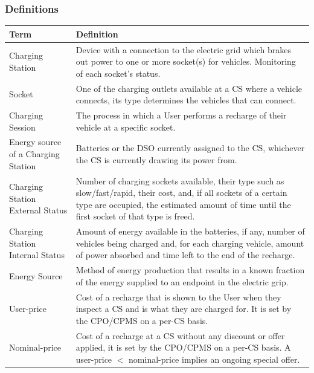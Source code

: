 \documentclass[11pt]{article}
\begin{document}
\subsubsection{Definitions}

\begin{table}[H]
    \centering
    \setlength{\tabcolsep}{18pt}
    \renewcommand{\arraystretch}{1.2}
    \begin{tabularx}{\textwidth}{|>{\centering\hsize=0.4\hsize}X|>{\hsize=1.6\hsize}X|}
        \hline
        \textbf{Term} & \textbf{Definition} \\
        \hline
        Charging Station & Device with a connection to the electric grid which brakes out power to one or more socket(s) for vehicles. Monitoring of each socket's status. \\
        \hline
        Socket & One of the charging outlets available at a CS where a vehicle connects, its type determines the vehicles that can connect. \\
        \hline
        Charging Session & The process in which a User performs a recharge of their vehicle at a specific socket. \\
        \hline
        Energy source of a Charging Station & Batteries or the DSO currently assigned to the CS, whichever the CS is currently drawing its power from. \\
        \hline
        Charging Station External Status & Number of charging sockets available, their type such as slow/fast/rapid, their cost, and, if all sockets of a certain type are occupied, the estimated amount of time until the first socket of that type is freed. \\
        \hline
        Charging Station Internal Status & Amount of energy available in the batteries, if any, number of vehicles being charged and, for each charging vehicle, amount of power absorbed and time left to the end of the recharge. \\
        \hline
        Energy Source & Method of energy production that results in a known fraction of the energy supplied to an endpoint in the electric grip. \\
        \hline
        User-price & Cost of a recharge that is shown to the User when they inspect a CS and is what they are charged for. It is set by the CPO/CPMS on a per-CS basis.\\
        \hline
        Nominal-price & Cost of a recharge at a CS without any discount or offer applied, it is set by the CPO/CPMS on a per-CS basis. A user-price $<$ nominal-price implies an ongoing special offer. \\

\end{tabularx}
\end{table}
\end{document}
